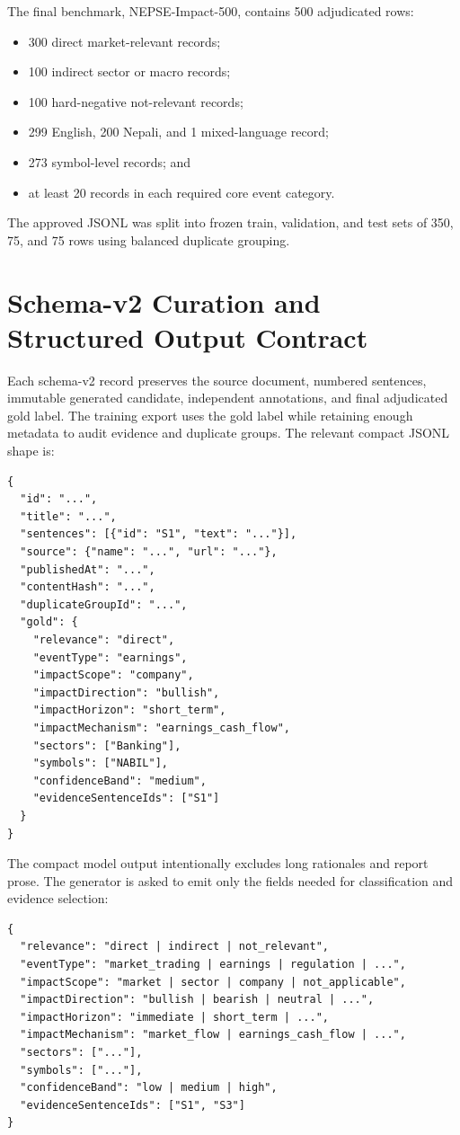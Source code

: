 \documentclass[12pt,a4paper]{report}
\begin{document}
The final benchmark, NEPSE-Impact-500, contains 500 adjudicated rows:
\begin{itemize}[leftmargin=1.6em]
    \item 300 direct market-relevant records;
    \item 100 indirect sector or macro records;
    \item 100 hard-negative not-relevant records;
    \item 299 English, 200 Nepali, and 1 mixed-language record;
    \item 273 symbol-level records; and
    \item at least 20 records in each required core event category.
\end{itemize}
The approved JSONL was split into frozen train, validation, and test sets of 350, 75, and 75 rows using balanced duplicate grouping.

\section{Schema-v2 Curation and Structured Output Contract}
Each schema-v2 record preserves the source document, numbered sentences, immutable generated candidate, independent annotations, and final adjudicated gold label. The training export uses the gold label while retaining enough metadata to audit evidence and duplicate groups. The relevant compact JSONL shape is:

\begin{small}
\begin{verbatim}
{
  "id": "...",
  "title": "...",
  "sentences": [{"id": "S1", "text": "..."}],
  "source": {"name": "...", "url": "..."},
  "publishedAt": "...",
  "contentHash": "...",
  "duplicateGroupId": "...",
  "gold": {
    "relevance": "direct",
    "eventType": "earnings",
    "impactScope": "company",
    "impactDirection": "bullish",
    "impactHorizon": "short_term",
    "impactMechanism": "earnings_cash_flow",
    "sectors": ["Banking"],
    "symbols": ["NABIL"],
    "confidenceBand": "medium",
    "evidenceSentenceIds": ["S1"]
  }
}
\end{verbatim}
\end{small}

The compact model output intentionally excludes long rationales and report prose. The generator is asked to emit only the fields needed for classification and evidence selection:

\begin{small}
\begin{verbatim}
{
  "relevance": "direct | indirect | not_relevant",
  "eventType": "market_trading | earnings | regulation | ...",
  "impactScope": "market | sector | company | not_applicable",
  "impactDirection": "bullish | bearish | neutral | ...",
  "impactHorizon": "immediate | short_term | ...",
  "impactMechanism": "market_flow | earnings_cash_flow | ...",
  "sectors": ["..."],
  "symbols": ["..."],
  "confidenceBand": "low | medium | high",
  "evidenceSentenceIds": ["S1", "S3"]
}
\end{verbatim}
\end{small}
\end{document}
